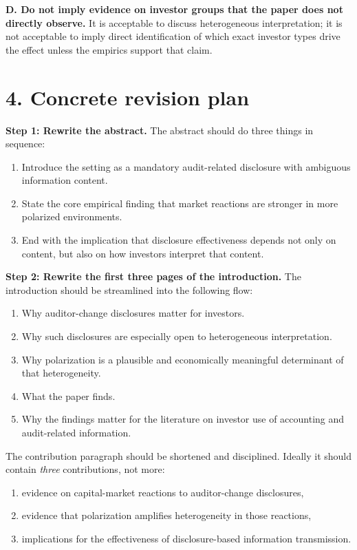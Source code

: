 \documentclass[11pt]{article}
\begin{document}
\textbf{D. Do not imply evidence on investor groups that the paper does not directly observe.} It is acceptable to discuss heterogeneous interpretation; it is not acceptable to imply direct identification of which exact investor types drive the effect unless the empirics support that claim.

\section*{4. Concrete revision plan}

\textbf{Step 1: Rewrite the abstract.} The abstract should do three things in sequence:
\begin{enumerate}[leftmargin=1.5em]
    \item Introduce the setting as a mandatory audit-related disclosure with ambiguous information content.
    \item State the core empirical finding that market reactions are stronger in more polarized environments.
    \item End with the implication that disclosure effectiveness depends not only on content, but also on how investors interpret that content.
\end{enumerate}

\textbf{Step 2: Rewrite the first three pages of the introduction.} The introduction should be streamlined into the following flow:
\begin{enumerate}[leftmargin=1.5em]
    \item Why auditor-change disclosures matter for investors.
    \item Why such disclosures are especially open to heterogeneous interpretation.
    \item Why polarization is a plausible and economically meaningful determinant of that heterogeneity.
    \item What the paper finds.
    \item Why the findings matter for the literature on investor use of accounting and audit-related information.
\end{enumerate}

The contribution paragraph should be shortened and disciplined. Ideally it should contain \emph{three} contributions, not more:
\begin{enumerate}[leftmargin=1.5em]
    \item evidence on capital-market reactions to auditor-change disclosures,
    \item evidence that polarization amplifies heterogeneity in those reactions,
    \item implications for the effectiveness of disclosure-based information transmission.
\end{enumerate}
\end{document}

